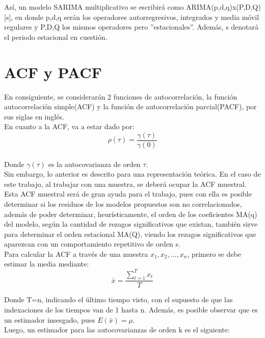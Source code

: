 \documentclass{report}
\begin{document}
    Así, un modelo SARIMA multiplicativo se escribirá como ARIMA(p,d,q)x(P,D,Q)[s], en donde p,d,q serán los operadores autorregresivos, integrados y media móvil regulares y P,D,Q los mismos operadores pero ''estacionales''. Además, s denotará el periodo estacional en cuestión.\\
\section{ACF y PACF}
En consiguiente, se considerarán 2 funciones de autocorrelación, la función autocorrelación simple(ACF) y la función de autocorrelación parcial(PACF), por sus siglas en inglés.\\

En cuanto a la ACF, va a estar dado por:\\
\begin{equation}
    \rho(\tau)=\frac{\gamma (\tau)}{\gamma(0)}
\end{equation}\\

Donde $\gamma (\tau)$ es la autocovarianza de orden $\tau$.\\

Sin embargo, lo anterior es descrito para una representación teórica. En el caso de este trabajo, al trabajar con una muestra, se deberá ocupar la ACF muestral. Esta ACF muestral será de gran ayuda para el trabajo, pues con ella es posible determinar si los residuos de los modelos propuestos son no correlacionados, además de poder determinar, heurísticamente, el orden de los coeficientes MA(q) del modelo, según la cantidad de rezagos significativos que existan, también sirve para determinar el orden estacional MA(Q), viendo los rezagos significativos que aparezcan con un comportamiento repetitivo de orden s.\\

Para calcular la ACF a través de una muestra $x_{1},x_{2},...,x_{n}$, primero se debe estimar la media mediante:\\
\begin{equation}
\bar{x}=\frac{\sum_{t=1}^{T}x_{t}}{T}
\end{equation}

Donde T=n, indicando el último tiempo visto, con el supuesto de que las indexaciones de los tiempos van de 1 hasta n. Además, es posible observar que es un estimador insesgado, pues $E(\bar{x})=\mu$.\\

Luego, un estimador para las autocovarianzas de orden k es el siguiente:\\
\end{document}
